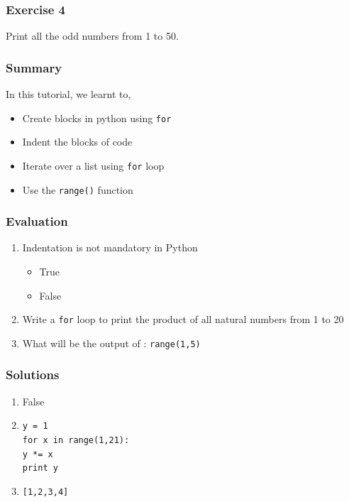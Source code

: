 \documentclass[17pt]{beamer}
\begin{document}
\begin{frame}
\frametitle{Exercise 4}
  Print all the odd numbers from 1 to 50.
\end{frame}
\begin{frame}
\frametitle{Summary}
  In this tutorial, we learnt to,\pause
\begin{itemize}
\item Create blocks in python using \texttt{for}\pause
\item Indent the blocks of code\pause
\item Iterate over a list using \texttt{for} loop\pause
\item Use the \texttt{range()} function
\end{itemize}
\end{frame}
\begin{frame}
\frametitle{Evaluation}
\begin{enumerate}
    \item Indentation is not mandatory in Python
    \begin{itemize}
        \item True
        \item False\pause
    \end{itemize}
    \vspace{8pt}
    \item Write a \texttt{for} loop to print the product of all natural numbers from 1 to 20\pause
    \vspace{8pt}
    \item What will be the output of : \texttt{range(1,5)}
\end{enumerate}
\end{frame}
\begin{frame}
\frametitle{Solutions}
\begin{enumerate}
    \item False
    \vspace{8pt}
    \item \texttt{y = 1}\\
    \texttt{for x in range(1,21):}\\
    \hspace{12pt}
              \texttt{y *= x}\\
        \texttt{print y} 
    \vspace{8pt}      
    \item \texttt{[1,2,3,4]}
\end{enumerate}
\end{frame}
\end{document}
